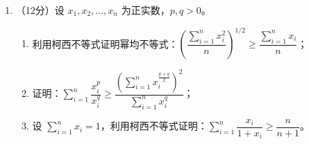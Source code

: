 \documentclass[12pt, a4paper]{ctexart}
\begin{document}
\begin{enumerate}[resume]
\item （12分）设 $x_1, x_2, \ldots, x_n$ 为正实数，$p, q > 0$。
\begin{enumerate}[label=(\arabic*)]
\item 利用柯西不等式证明幂均不等式：$\left(\dfrac{\displaystyle\sum_{i=1}^{n} x_i^2}{n}\right)^{1/2} \geqslant \dfrac{\displaystyle\sum_{i=1}^{n} x_i}{n}$；
\item 证明：$\displaystyle\sum_{i=1}^{n} \dfrac{x_i^p}{x_i^q} \geqslant \dfrac{\left(\displaystyle\sum_{i=1}^{n} x_i^{\frac{p+q}{2}}\right)^2}{\displaystyle\sum_{i=1}^{n} x_i^q}$；
\item 设 $\displaystyle\sum_{i=1}^{n} x_i = 1$，利用柯西不等式证明：$\displaystyle\sum_{i=1}^{n} \dfrac{x_i}{1 + x_i} \geqslant \dfrac{n}{n+1}$。
\end{enumerate}

\end{enumerate}
\end{document}
